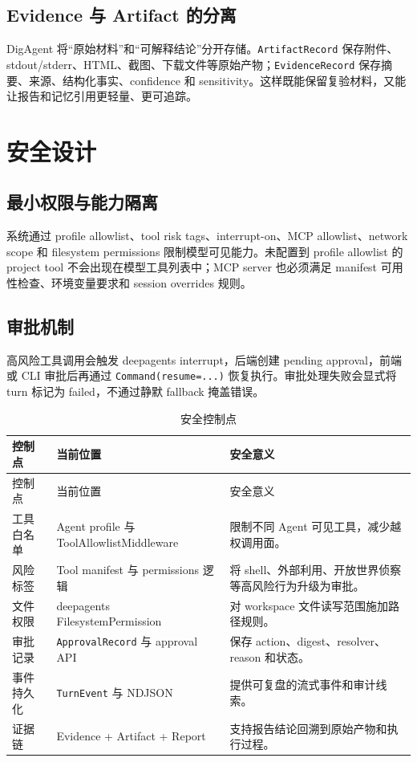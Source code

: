 \documentclass[UTF8,zihao=-4,a4paper,fontset=none]{ctexart}
\newcommand{\code}[1]{\texttt{\footnotesize #1}}
\begin{document}
\subsection{Evidence 与 Artifact 的分离}

DigAgent 将“原始材料”和“可解释结论”分开存储。\code{ArtifactRecord} 保存附件、stdout/stderr、HTML、截图、下载文件等原始产物；\code{EvidenceRecord} 保存摘要、来源、结构化事实、confidence 和 sensitivity。这样既能保留复验材料，又能让报告和记忆引用更轻量、更可追踪。

\section{安全设计}

\subsection{最小权限与能力隔离}

系统通过 profile allowlist、tool risk tags、interrupt-on、MCP allowlist、network scope 和 filesystem permissions 限制模型可见能力。未配置到 profile allowlist 的 project tool 不会出现在模型工具列表中；MCP server 也必须满足 manifest 可用性检查、环境变量要求和 session overrides 规则。

\subsection{审批机制}

高风险工具调用会触发 deepagents interrupt，后端创建 pending approval，前端或 CLI 审批后再通过 \code{Command(resume=...)} 恢复执行。审批处理失败会显式将 turn 标记为 failed，不通过静默 fallback 掩盖错误。

\begin{longtable}{L{0.22\textwidth}L{0.30\textwidth}L{0.38\textwidth}}
\caption{安全控制点}\label{tab:security}\\
\toprule
控制点 & 当前位置 & 安全意义 \\
\midrule
\endfirsthead
\toprule
控制点 & 当前位置 & 安全意义 \\
\midrule
\endhead
工具白名单 & Agent profile 与 ToolAllowlistMiddleware & 限制不同 Agent 可见工具，减少越权调用面。 \\
风险标签 & Tool manifest 与 permissions 逻辑 & 将 shell、外部利用、开放世界侦察等高风险行为升级为审批。 \\
文件权限 & deepagents FilesystemPermission & 对 workspace 文件读写范围施加路径规则。 \\
审批记录 & \code{ApprovalRecord} 与 approval API & 保存 action、digest、resolver、reason 和状态。 \\
事件持久化 & \code{TurnEvent} 与 NDJSON & 提供可复盘的流式事件和审计线索。 \\
证据链 & Evidence + Artifact + Report & 支持报告结论回溯到原始产物和执行过程。 \\
\bottomrule
\end{longtable}
\end{document}
